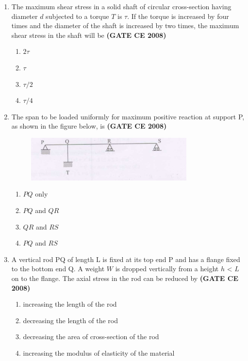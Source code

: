 \documentclass[journal]{IEEEtran}
\begin{document}
\begin{enumerate}
\item The maximum shear stress in a solid shaft of circular cross-section having diameter $d$ subjected to a torque $T$ is $\tau$. If the torque is increased by four times and the diameter of the shaft is increased by two times, the maximum shear stress in the shaft will be  \textbf{(GATE CE 2008)}
\begin{multicols}{2}
\begin{enumerate}
\item $2\tau$
\item $\tau$
\item $\tau /2$
\item $\tau /4$
\end{enumerate}
\end{multicols}

\item The span to be loaded uniformly for maximum positive  reaction at support P, as shown in the figure below, is \textbf{(GATE CE 2008)}
\begin{figure}[h]
    \centering
    \includegraphics[width=0.8\textwidth]{image/image8.png}
\end{figure}

\vspace{0.1cm}

\begin{multicols}{2}
\begin{enumerate}
\item $PQ$ only
\item $PQ$ and $QR$
\item $QR$ and $RS$
\item $PQ$ and $RS$
\end{enumerate}
\end{multicols}

\item A vertical rod PQ of length L is fixed at its top end P and has a flange fixed to the bottom end Q. A weight $W$ is dropped vertically from a height $h$ < $L$ on to the flange. The axial stress in the rod can be reduced by \textbf{(GATE CE 2008)}

\begin{enumerate}
\item increasing the length of the rod 
\item decreasing the length of the rod
\item decreasing the area of cross-section of the rod
\item increasing the modulus of elasticity of the material
\end{enumerate}


\end{enumerate}
\end{document}
